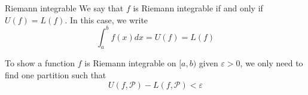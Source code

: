 \begin{definition}{Riemann integrable}{}
    We say that $f$ is Riemann integrable if and only if $U(f)=L(f)$. In this case, we write $$\int_a^b f(x) d x=U(f)=L(f)$$
    
    \noindent To show a function $f$ is Riemann integrable on $[a, b)$ given $\varepsilon>0$, we only need to find one partition such that $$U(f, \mathcal{P})-L(f, \mathcal{P})<\varepsilon$$
\end{definition}